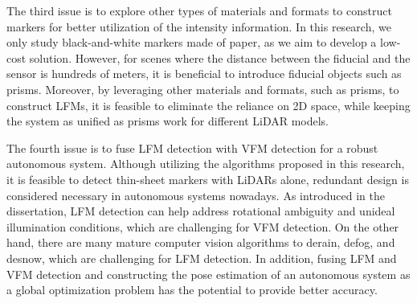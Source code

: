 \par
The third issue is to explore other types of materials and formats to construct markers for better utilization of the intensity information. In this research, we only study black-and-white markers made of paper, as we aim to develop a low-cost solution. However, for scenes where the distance between the fiducial and the sensor is hundreds of meters, it is beneficial to introduce fiducial objects such as prisms. Moreover, by leveraging other materials and formats, such as prisms, to construct LFMs, it is feasible to eliminate the reliance on 2D space, while keeping the system as unified as prisms work for different LiDAR models.
\par
The fourth issue is to fuse LFM detection with VFM detection for a robust autonomous system. Although utilizing the algorithms proposed in this research, it is feasible to detect thin-sheet markers with LiDARs alone, redundant design is considered necessary in autonomous systems nowadays. As introduced in the dissertation, LFM detection can help address rotational ambiguity and unideal illumination conditions, which are challenging for VFM detection. On the other hand, there are many mature computer vision algorithms to derain, defog, and desnow, which are challenging for LFM detection. In addition, fusing LFM and VFM detection and constructing the pose estimation of an autonomous system as a global optimization problem has the potential to provide better accuracy.